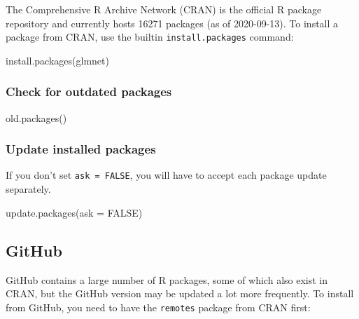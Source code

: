 \documentclass[
]{book}
\newenvironment{Shaded}{\begin{snugshade}}{\end{snugshade}}
\newcommand{\AttributeTok}[1]{\textcolor[rgb]{0.77,0.63,0.00}{#1}}
\newcommand{\ConstantTok}[1]{\textcolor[rgb]{0.00,0.00,0.00}{#1}}
\newcommand{\FunctionTok}[1]{\textcolor[rgb]{0.00,0.00,0.00}{#1}}
\newcommand{\NormalTok}[1]{#1}
\newcommand{\StringTok}[1]{\textcolor[rgb]{0.31,0.60,0.02}{#1}}
\begin{document}
The Comprehensive R Archive Network (CRAN) is the official R package repository and currently hosts 16271 packages (as of 2020-09-13). To install a package from CRAN, use the builtin \texttt{install.packages} command:

\begin{Shaded}
\begin{Highlighting}[]
\FunctionTok{install.packages}\NormalTok{(}\StringTok{\textquotesingle{}glmnet\textquotesingle{}}\NormalTok{)}
\end{Highlighting}
\end{Shaded}

\hypertarget{check-for-outdated-packages}{%
\subsubsection{Check for outdated packages}\label{check-for-outdated-packages}}

\begin{Shaded}
\begin{Highlighting}[]
\FunctionTok{old.packages}\NormalTok{()}
\end{Highlighting}
\end{Shaded}

\hypertarget{update-installed-packages}{%
\subsubsection{Update installed packages}\label{update-installed-packages}}

If you don't set \texttt{ask\ =\ FALSE}, you will have to accept each package update separately.

\begin{Shaded}
\begin{Highlighting}[]
\FunctionTok{update.packages}\NormalTok{(}\AttributeTok{ask =} \ConstantTok{FALSE}\NormalTok{)}
\end{Highlighting}
\end{Shaded}

\hypertarget{github}{%
\subsection{GitHub}\label{github}}

GitHub contains a large number of R packages, some of which also exist in CRAN, but the GitHub version may be updated a lot more frequently. To install from GitHub, you need to have the \texttt{remotes} package from CRAN first:
\end{document}
